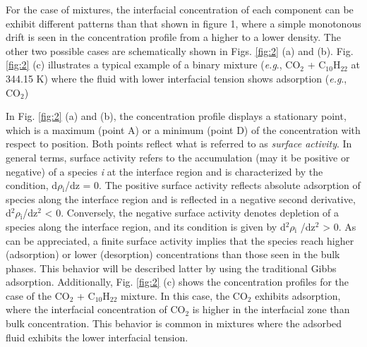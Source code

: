 \documentclass[9pt,bestpractices]{livecoms}
\begin{document}
For the case of mixtures, the interfacial concentration of each component can
be exhibit different patterns than that shown in figure 1, where a simple
monotonous drift is seen in the concentration profile from a higher to a lower
density. The other two possible cases are schematically shown in Figs.
\ref{fig:2} (a) and (b). Fig. \ref{fig:2} (c) illustrates a typical example of a binary mixture
(\textit{e.g}., CO$_{2}$ + C$_{10}$H$_{22}$ at 344.15 K) where the fluid with
lower interfacial tension shows adsorption (\textit{e.g}., CO$_{2}$)

In Fig. \ref{fig:2} (a) and (b), the concentration profile displays a stationary point,
which is a maximum (point A) or a minimum (point D) of the concentration with
respect to position. Both points reflect what is referred to as \textit{surface
activity}. In general terms, surface activity refers to the accumulation (may
it be positive or negative) of a species \textit{i} at the interface region and
is characterized by the condition, d${\rho}$$_{\mathrm{i}}$/dz = 0. The
positive surface activity reflects absolute adsorption of species along the
interface region and is reflected in a negative second derivative,
d$^{2}$${\rho}$$_{\mathrm{i}}$/dz$^{2}$ {\textless} 0. Conversely, the negative
surface activity denotes depletion of a species along the interface region, and
its condition is given by d$^{2}$${\rho}$$_{\mathrm{i}}$ /dz$^{2}$
{\textgreater} 0. As can be appreciated, a finite surface activity implies that
the species reach higher (adsorption) or lower (desorption) concentrations than
those seen in the bulk phases. This behavior will be described latter by using
the traditional Gibbs adsorption. Additionally, Fig. \ref{fig:2} (c) shows the
concentration profiles for the case of the CO$_{2}$ + C$_{10}$H$_{22}$ mixture.
In this case, the CO$_{2}$ exhibits adsorption, where the interfacial
concentration of CO$_{2}$ is higher in the interfacial zone than bulk
concentration. This behavior is common in mixtures where the adsorbed fluid
exhibits the lower interfacial tension.     
\end{document}
